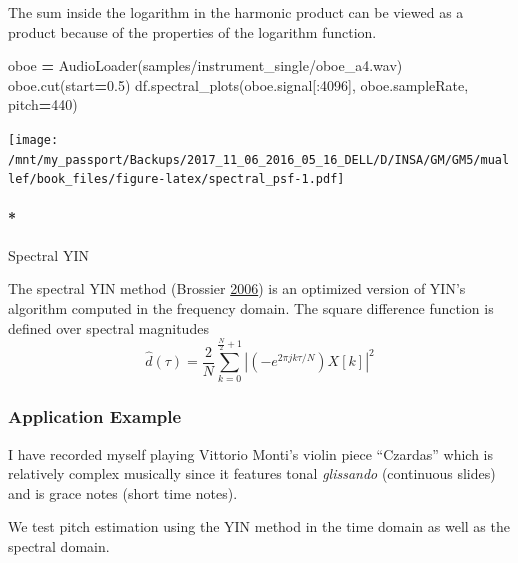 \documentclass[
  american,
]{article}
\newenvironment{Shaded}{\begin{snugshade}}{\end{snugshade}}
\newcommand{\DecValTok}[1]{\textcolor[rgb]{0.00,0.00,0.81}{#1}}
\newcommand{\FloatTok}[1]{\textcolor[rgb]{0.00,0.00,0.81}{#1}}
\newcommand{\NormalTok}[1]{#1}
\newcommand{\OperatorTok}[1]{\textcolor[rgb]{0.81,0.36,0.00}{\textbf{#1}}}
\newcommand{\StringTok}[1]{\textcolor[rgb]{0.31,0.60,0.02}{#1}}
\let\oldparagraph\paragraph
\renewcommand{\paragraph}[1]{\oldparagraph*{#1}}
\begin{document}
The sum inside the logarithm in the harmonic product
can be viewed as a product because of the properties
of the logarithm function.

\begin{Shaded}
\begin{Highlighting}[]
\NormalTok{oboe }\OperatorTok{=}\NormalTok{ AudioLoader(}\StringTok{\textquotesingle{}samples/instrument\_single/oboe\_a4.wav\textquotesingle{}}\NormalTok{)}
\NormalTok{oboe.cut(start}\OperatorTok{=}\FloatTok{0.5}\NormalTok{)}
\NormalTok{df.spectral\_plots(oboe.signal[:}\DecValTok{4096}\NormalTok{], oboe.sampleRate, pitch}\OperatorTok{=}\DecValTok{440}\NormalTok{)}
\end{Highlighting}
\end{Shaded}

\texttt{[image: /mnt/my\_passport/Backups/2017\_11\_06\_2016\_05\_16\_DELL/D/INSA/GM/GM5/muallef/book\_files/figure-latex/spectral\_psf-1.pdf]}

\hypertarget{spectral-yin}{%
\paragraph*{Spectral YIN}\label{spectral-yin}}

The spectral YIN method (Brossier \protect\hyperlink{ref-brossier}{2006}) is an optimized version of YIN's
algorithm computed in the frequency domain.
The square difference function is defined over spectral magnitudes
\[\hat{d}(\tau) = \frac{2}{N} \sum\limits_{k=0}^{\frac{N}{2}+1}
    \left\lvert\left(-e^{2\pi jk\tau/N}\right) X[k]\right\rvert^2\]

\hypertarget{application-example}{%
\subsubsection{Application Example}\label{application-example}}

I have recorded myself playing Vittorio Monti's
violin piece ``Czardas'' which is relatively
complex musically since it features tonal
\emph{glissando} (continuous slides) and is grace notes
(short time notes).

We test pitch estimation using the YIN method
in the time domain as well as the spectral domain.
\end{document}

